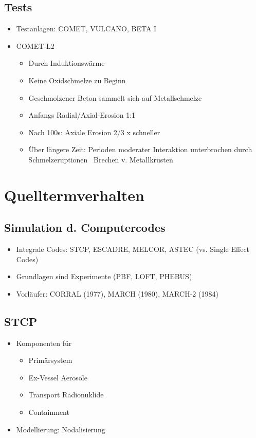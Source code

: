 \documentclass[12pt]{article}
\begin{document}
\subsection{Tests}
\begin{itemize}
  \item Testanlagen: COMET, VULCANO, BETA I
  \item COMET-L2
  \begin{itemize}
    \item Durch Induktionswärme
    \item Keine Oxidschmelze zu Beginn
    \item Geschmolzener Beton sammelt sich auf Metallschmelze
    \item Anfangs Radial/Axial-Erosion 1:1
    \item Nach 100s: Axiale Erosion 2/3 x schneller
    \item Über längere Zeit: Perioden moderater Interaktion unterbrochen durch Schmelzeruptionen
    \textrightarrow\ Brechen v. Metallkrusten
  \end{itemize}
\end{itemize}

\section{Quelltermverhalten}

\subsection{Simulation d. Computercodes}
\begin{itemize}
  \item Integrale Codes: STCP, ESCADRE, MELCOR, ASTEC (vs. Single Effect Codes)
  \item Grundlagen sind Experimente (PBF, LOFT, PHEBUS)
  \item Vorläufer: CORRAL (1977), MARCH (1980), MARCH-2 (1984)
\end{itemize}

\subsection{STCP}
\begin{itemize}
  \item Komponenten für
  \begin{itemize}
    \item Primärsystem
    \item Ex-Vessel Aerosole
    \item Transport Radionuklide
    \item Containment
  \end{itemize}
  \item Modellierung: Nodalisierung
\end{itemize}
\end{document}
